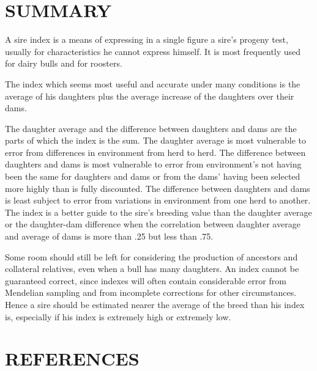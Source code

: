 \section*{SUMMARY}

A sire index is a means of expressing in a single figure a sire's progeny
test, usually for characteristics he cannot express himself. It is
most frequently used for dairy bulls and for roosters.

The index which seems most useful and accurate under many conditions
is the average of his daughters plus the average increase of the
daughters over their dams.

The daughter average and the difference between daughters and
dams are the parts of which the index is the sum. The daughter average
is most vulnerable to error from differences in environment from herd
to herd. The difference between daughters and dams is most vulnerable
to error from environment's not having been the same for daughters
and dams or from the dams' having been selected more highly than is
fully discounted. The difference between daughters and dams is least
subject to error from variations in environment from one herd to
another. The index is a better guide to the sire's breeding value than
the daughter average or the daughter-dam difference when the correlation
between daughter average and average of dams is more than .25
but less than .75.

Some room should still be left for considering the production of
ancestors and collateral relatives, even when a bull has many daughters.
An index cannot be guaranteed correct, since indexes will often contain
considerable error from Mendelian sampling and from incomplete corrections
for other circumstances. Hence a sire should be estimated nearer
the average of the breed than his index is, especially if his index is
extremely high or extremely low.

\section*{REFERENCES}

